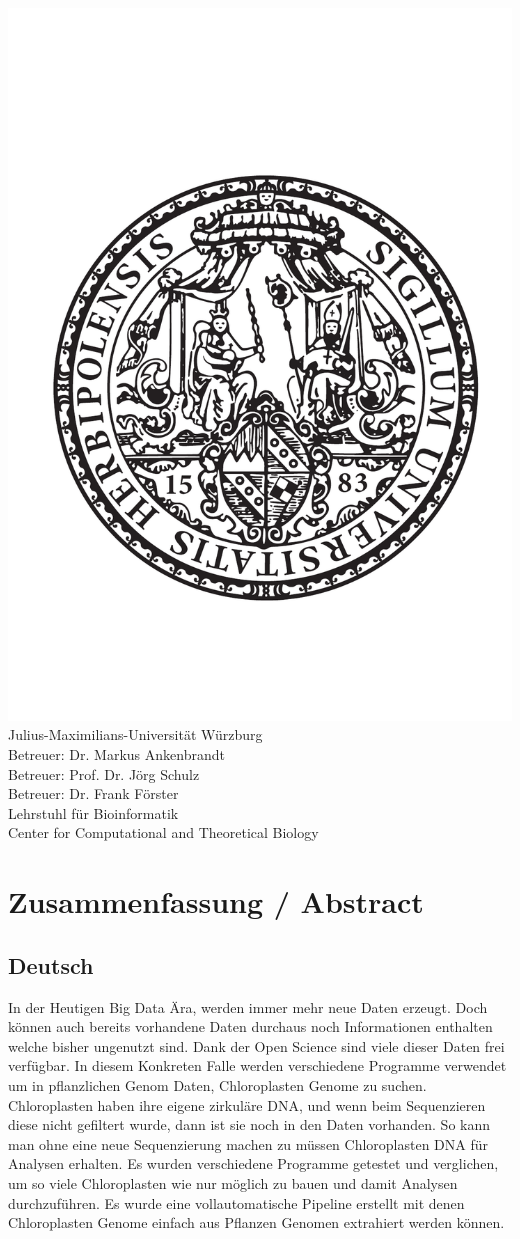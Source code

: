 \documentclass{scrartcl}
\begin{document}
\begin{center}
\includegraphics[width=.5\linewidth]{./neuSIEGEL.pdf}\\[1cm]
{\large Julius-Maximilians-Universität Würzburg}\\
{\large Betreuer: Dr. Markus Ankenbrandt}\\
{\large Betreuer: Prof. Dr. Jörg Schulz}\\
{\large Betreuer: Dr. Frank Förster}\\
{\large Lehrstuhl für Bioinformatik}\\
{\large Center for Computational and Theoretical Biology}
\setcounter{page}{1}
\clearpage
\end{center}
\tableofcontents
\clearpage
\section{Zusammenfassung / Abstract}
\label{sec-1}
\subsection{Deutsch}
\label{sec-1-1}
In der Heutigen Big Data Ära, werden immer mehr neue Daten erzeugt. Doch können auch bereits vorhandene Daten durchaus noch Informationen enthalten welche bisher ungenutzt sind.
Dank der Open Science sind viele dieser Daten frei verfügbar. In diesem Konkreten Falle werden verschiedene Programme verwendet um in pflanzlichen Genom Daten, Chloroplasten Genome zu 
suchen. Chloroplasten haben ihre eigene zirkuläre DNA, und wenn beim Sequenzieren diese nicht gefiltert wurde, dann ist sie noch in den Daten vorhanden. So kann man ohne 
eine neue Sequenzierung machen zu müssen Chloroplasten DNA für Analysen erhalten. Es wurden verschiedene Programme getestet und verglichen, um so viele Chloroplasten 
wie nur möglich zu bauen und damit Analysen durchzuführen. Es wurde eine vollautomatische Pipeline erstellt mit denen Chloroplasten Genome einfach aus Pflanzen Genomen
extrahiert werden können. 
\end{document}
